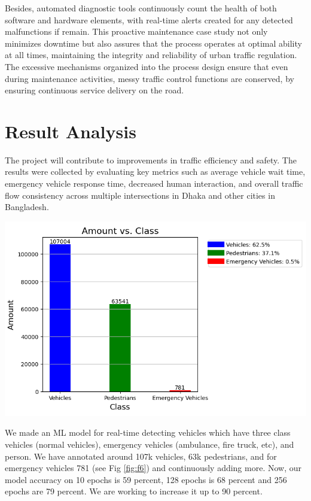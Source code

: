 \documentclass[usenatbib]{tjaa}
\begin{document}
Besides, automated diagnostic tools continuously count the health of both software and hardware elements, with real-time alerts created for any detected malfunctions if remain. This proactive maintenance case study not only minimizes downtime but also assures that the process operates at optimal ability at all times, maintaining the integrity and reliability of urban traffic regulation. The excessive mechanisms organized into the process design ensure that even during maintenance activities, messy traffic control functions are conserved, by ensuring continuous service delivery on the road.

\section[]{Result Analysis}
The project will contribute to improvements in traffic efficiency and safety. The results were collected by evaluating key metrics such as average vehicle wait time, emergency vehicle response time, decreased human interaction, and overall traffic flow consistency across multiple intersections in Dhaka and other cities in Bangladesh.

\begin{minipage}{0.5\textwidth}
    \centering
    \includegraphics[width=\textwidth]{11.png} %
    \label{fig:f6}
\end{minipage}%
We made an ML model for real-time detecting vehicles which have three class vehicles (normal vehicles), emergency vehicles (ambulance, fire truck, etc), and person. We have annotated around 107k vehicles, 63k pedestrians, and for emergency vehicles 781 (see Fig \ref{fig:f6}) and continuously adding more. Now, our model accuracy on 10 epochs is 59 percent, 128 epochs is 68 percent and 256 epochs are 79 percent. We are working to increase it up to 90 percent.
\end{document}
